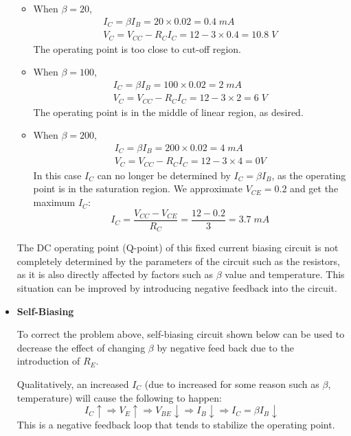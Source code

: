 \begin{itemize}
\begin{itemize}
\item When $\beta=20$,
  \[ 
  \begin{array}{l} I_C=\beta I_B=20\times 0.02=0.4 \;mA \\
    V_C=V_{CC}-R_C I_C=12-3\times 0.4=10.8\; V \end{array}	
  \]
  The operating point is too close to cut-off region.

\item When $\beta=100$, 
  \[
  \begin{array}{l} I_C=\beta I_B=100\times 0.02=2 \;mA \\
    V_C=V_{CC}-R_C I_C=12-3\times 2=6 \;V \end{array} 
  \]
  The operating point is in the middle of linear region, as desired.

\item When $\beta=200$,
  \[ 
  \begin{array}{l} I_C=\beta I_B=200\times 0.02=4 \;mA \\
    V_C=V_{CC}-R_C I_C=12-3\times 4=0 V \end{array} 
  \]
  In this case $I_C$ can no longer be determined by $I_C=\beta I_B$, as
  the operating point is in the saturation region. We approximate
  $V_{CE}=0.2$ and get the maximum $I_C$:
  \[
  I_C=\frac{V_{CC}-V_{CE}}{R_C}=\frac{12-0.2}{3}=3.7\;mA 
  \] 
\end{itemize}

The DC operating point (Q-point) of this fixed current biasing circuit
is not completely determined by the parameters of the circuit such 
as the resistors, as it is also directly affected by factors such 
as $\beta$ value and temperature. This situation can be improved by 
introducing negative feedback into the circuit.

\item {\bf Self-Biasing} 

To correct the problem above, self-biasing circuit shown below can be
used to decrease the effect of changing $\beta$ by negative feed back
due to the introduction of $R_E$.


Qualitatively, an increased $I_C$ (due to increased for some reason
such as $\beta$, temperature) will cause the following to happen:
\[
I_C \uparrow \Longrightarrow V_E \uparrow \Longrightarrow V_{BE} 
\downarrow \Longrightarrow I_B \downarrow \Longrightarrow 
I_C=\beta I_B \downarrow	
\]
This is a negative feedback loop that tends to stabilize the operating point.


\end{itemize}
